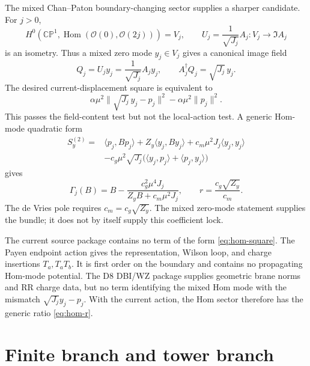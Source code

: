 \documentclass[11pt]{article}
\newcommand{\CP}{\mathbb{CP}}
\newcommand{\OO}{\mathcal{O}}
\theoremstyle{plain}
\theoremstyle{definition}
\begin{document}
The mixed Chan--Paton boundary-changing sector supplies a sharper candidate.
For \(j>0\),
\begin{equation}
  H^0(\CP^1,\operatorname{Hom}(\OO(0),\OO(2j)))=V_j,
  \qquad
  U_j=\frac{1}{\sqrt{J_j}}A_j:V_j\to\Im A_j
  \label{eq:hom-u}
\end{equation}
is an isometry.  Thus a mixed zero mode \(y_j\in V_j\) gives a canonical image
field
\begin{equation}
  Q_j=U_jy_j=\frac{1}{\sqrt{J_j}}A_jy_j,
  \qquad
  A_j^\dagger Q_j=\sqrt{J_j}\,y_j .
  \label{eq:hom-q}
\end{equation}
The desired current-displacement square is equivalent to
\begin{equation}
  \alpha\mu^2\|\sqrt{J_j}\,y_j-p_j\|^2
  -\alpha\mu^2\|p_j\|^2 .
  \label{eq:hom-square}
\end{equation}
This passes the field-content test but not the local-action test.  A generic
Hom-mode quadratic form
\begin{equation}
\begin{split}
  S_y^{(2)}
  ={}&\langle p_j,Bp_j\rangle
  +Z_y\langle y_j,By_j\rangle
  +c_m\mu^2J_j\langle y_j,y_j\rangle\\
  &-c_g\mu^2\sqrt{J_j}
  \bigl(\langle y_j,p_j\rangle+\langle p_j,y_j\rangle\bigr)
\end{split}
\end{equation}
gives
\begin{equation}
  \Gamma_j(B)=B-\frac{c_g^2\mu^4J_j}{Z_yB+c_m\mu^2J_j},
  \qquad
  r=\frac{c_g\sqrt{Z_y}}{c_m}.
  \label{eq:hom-r}
\end{equation}
The de Vries pole requires \(c_m=c_g\sqrt{Z_y}\).  The mixed zero-mode
statement supplies the bundle; it does not by itself supply this coefficient
lock.

The current source package contains no term of the form \eqref{eq:hom-square}.  The Payen
endpoint action gives the representation, Wilson loop, and charge insertions
\(T_a,T_aT_b\).  It is first order on the boundary and contains no propagating
Hom-mode potential.  The D8 DBI/WZ package supplies geometric brane norms and
RR charge data, but no term identifying the mixed Hom mode with the mismatch
\(\sqrt{J_j}y_j-p_j\).  With the current action, the Hom sector therefore has
the generic ratio \eqref{eq:hom-r}.

\section{Finite branch and tower branch}
\end{document}

